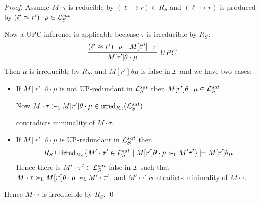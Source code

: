        \begin{proof}
            Assume \( M\cdot\tau \) is reducible by \( (\ell\to r)\in R_S \)
% 
            and \( (\ell\to r) \) is produced by \( (\ell'\approx r')\cdot\rho\in\mathcal{L}_S^{sat} \)

           \vspace{0.7em}
            Now a UPC-inference is applicable because \( \tau \) is irreducible by \( R_S \):
           \begin{gather*}
               \infer[UPC]
                {M[r']\theta\cdot\mu}
                {(\ell'\mEQ r')\cdot\rho & M[\ell'']\cdot\tau}
           \end{gather*}
           Then \( \mu \) is irreducible by \( R_S \), and \( M[r']\theta\mu \){ is false in }\( \mathcal{I} \) and we have two cases:

           \begin{itemize}
               \item If \( M[r']\theta\cdot\mu \) is not UP-redundant in \( \mathcal{L}_S^{sat} \)
                then \( M[r']\theta\cdot\mu\in\mathcal{L}_S^{sat} \).

               \vspace{0.3em}
                Now \( M\cdot\tau\mathrel\succ_{\mathtt{L}}
                M[r']\theta\cdot\mu\in \operatorname{irred}_{R_S}(\mathcal{L}_S^{sat}) \)

                contradicts minimality of \( M\cdot\tau \).
               \hfill
               \vspace{0.3em}

               \item If \( M[r']\theta\cdot\mu \) is UP-redundant in \( \mathcal{L}_S^{sat} \) then
               \vspace{-0.3em}
               \begin{gather*}
                    R_S \cup \operatorname{irred}_{R_S}
                   \{
                        M'\cdot\tau'\in\mathcal{L}_S^{sat}\mid
                        M[r']\theta\cdot\mu \mathrel\succ_{\mathtt{L}} M'\tau'
                       \} \models M[r']\theta\mu
               \end{gather*}
                Hence there is \( M'\cdot\tau'\in\mathcal{L}_S^{sat} \) false in \( \mathcal{I} \) such that
               \( M\cdot\tau\mathrel\succ_{\mathtt{L}} M[r']\theta\cdot\mu\mathrel\succ_{\mathtt{L}} M'\cdot\tau' \),
and
               \( M'\cdot\tau' \) contradicts minimality of \( M\cdot\tau \).
               \hfill

           \end{itemize}

            Hence \( M\cdot\tau \) is irreducible by \( R_S \).
           \hfill\qed{}
       \end{proof}





